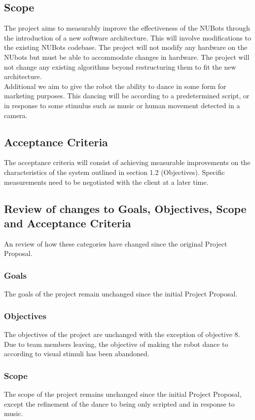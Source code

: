 \documentclass[a4paper]{article}
\begin{document}
		\subsection {Scope}
			The project aims to measurably improve the effectiveness of the NUBots through the introduction of a new software architecture. This will involve modifications to the existing NUBots codebase. The project will not modify any hardware on the NUbots but must be able to accommodate changes in hardware. The project will not change any existing algorithms beyond restructuring them to fit the new architecture.
			\\Additional we aim to give the robot the ability to dance in some form for marketing purposes. This dancing will be according to a predetermined script, or in response to some stimulus such as music or human movement detected in a camera.
		\subsection {Acceptance Criteria}
			The acceptance criteria will consist of achieving measurable improvements on the characteristics of the system outlined in section 1.2 (Objectives). Specific measurements need to be negotiated with the client at a later time.
		\subsection {Review of changes to Goals, Objectives, Scope and Acceptance Criteria}
			An review of how these categories have changed since the original Project Proposal.
			\subsubsection{Goals}
				The goals of the project remain unchanged since the initial Project Proposal.
			\subsubsection{Objectives}
				The objectives of the project are unchanged with the exception of objective 8. Due to team members leaving, the objective of making the robot dance to according to visual stimuli has been abandoned.
			\subsubsection{Scope}
				The scope of the project remains unchanged since the initial Project Proposal, except the refinement of the dance to being only scripted and in response to music.
\end{document}
